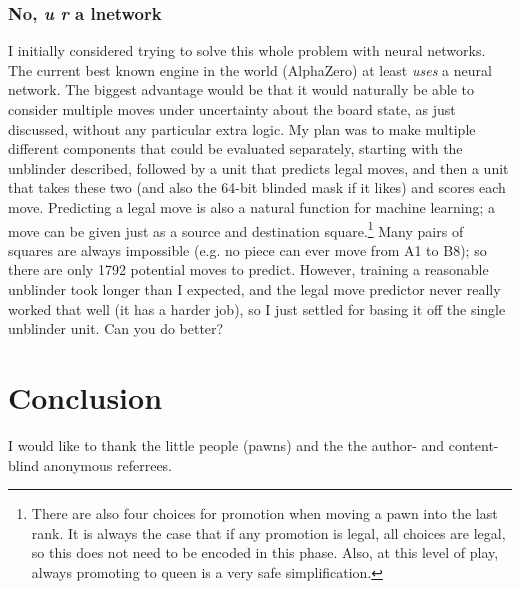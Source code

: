 \documentclass[twocolumn]{amsart}
\begin{document}
\subsubsection{No, {\em u r} a lnetwork} \label{sec:legalmove}
I initially considered trying to solve this whole problem with neural
networks. The current best known engine in the world (AlphaZero) at
least {\em uses} a neural network.
The biggest advantage would be that it would naturally be able to
consider multiple moves under uncertainty about the board state, as
just discussed, without any particular extra logic. My plan was to
make multiple different components that could be evaluated
separately, starting with the unblinder described, followed by a unit
that predicts legal moves, and then a unit that takes these two (and
also the 64-bit blinded mask if it likes) and scores each move.
Predicting a legal move is also a natural function for machine
learning; a move can be given just as a source and destination
square.\footnote{ There are also four choices for promotion when
  moving a pawn into the last rank. It is always the case that if any
  promotion is legal, all choices are legal, so this does not need to
  be encoded in this phase. Also, at this level of play, always
  promoting to queen is a very safe simplification.} Many pairs of
squares are always impossible (e.g. no piece can ever move from A1 to
B8); so there are only 1792 potential moves to predict. However,
training a reasonable unblinder took longer than I expected, and the
legal move predictor never really worked that well (it has a harder
job),
so I just settled for basing it off the single unblinder unit. Can you
do better?

\section{Conclusion}
% 

I would like to thank the little people (pawns) and the the author-
and content-blind anonymous referrees.
\end{document}
